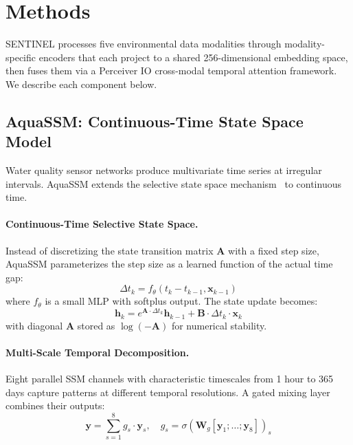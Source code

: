 \section{Methods}
\label{sec:methods}

SENTINEL processes five environmental data modalities through
modality-specific encoders that each project to a shared 256-dimensional
embedding space, then fuses them via a Perceiver IO cross-modal temporal
attention framework. We describe each component below.

\subsection{AquaSSM: Continuous-Time State Space Model}
\label{sec:aquassm}

Water quality sensor networks produce multivariate time series at irregular
intervals. AquaSSM extends the selective state space mechanism~\citep{Gu2024}
to continuous time.

\paragraph{Continuous-Time Selective State Space.}
Instead of discretizing the state transition matrix $\mathbf{A}$ with a fixed
step size, AquaSSM parameterizes the step size as a learned function of the
actual time gap:
\begin{equation}
    \Delta t_k = f_\theta(t_k - t_{k-1}, \mathbf{x}_{k-1})
\end{equation}
where $f_\theta$ is a small MLP with softplus output. The state update becomes:
\begin{equation}
    \mathbf{h}_k = e^{\mathbf{A} \cdot \Delta t_k} \mathbf{h}_{k-1}
    + \mathbf{B} \cdot \Delta t_k \cdot \mathbf{x}_k
\end{equation}
with diagonal $\mathbf{A}$ stored as $\log(-\mathbf{A})$ for numerical stability.

\paragraph{Multi-Scale Temporal Decomposition.}
Eight parallel SSM channels with characteristic timescales from 1 hour to 365
days capture patterns at different temporal resolutions. A gated mixing layer
combines their outputs:
\begin{equation}
    \mathbf{y} = \sum_{s=1}^{8} g_s \cdot \mathbf{y}_s, \quad
    g_s = \sigma(\mathbf{W}_g [\mathbf{y}_1; \ldots; \mathbf{y}_8])_s
\end{equation}

